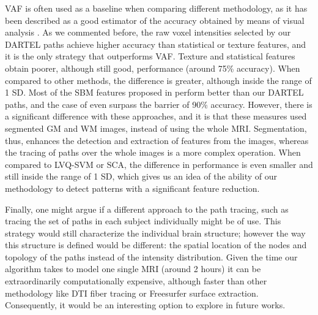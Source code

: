 	
	\ac{VAF} is often used as a baseline when comparing different methodology, as it has been described as a good estimator of the accuracy obtained by means of visual analysis \cite{Stoeckel04}. As we commented before, the raw voxel intensities selected by our DARTEL paths achieve higher accuracy than statistical or texture features, and it is the only strategy that outperforms \ac{VAF}. Texture and statistical features obtain poorer, although still good, performance (around 75\% accuracy). When compared to other methods, the difference is greater, although inside the range of 1 SD. Most of the \ac{SBM} features proposed in \cite{Martinez-Murcia2015} perform better than our DARTEL paths, and the case of \cite{Martinez-MurciaVRLBP} even surpass the barrier of 90\% accuracy. However, there is a significant difference with these approaches, and it is that these measures used segmented \ac{GM} and \ac{WM} images, instead of using the whole MRI. Segmentation, thus, enhances the detection and extraction of features from the images, whereas the tracing of paths over the whole images is a more complex operation. When compared to LVQ-SVM or SCA, the difference in performance is even smaller and still inside the range of 1 SD, which gives us an idea of the ability of our methodology to detect patterns with a significant feature reduction.
	
	Finally, one might argue if a different approach to the path tracing, such as tracing the set of paths in each subject individually might be of use. This strategy would still characterize the individual brain structure; however the way this structure is defined would be different: the spatial location of the nodes and topology of the paths instead of the intensity distribution. Given the time our algorithm takes to model one single MRI (around 2 hours) it can be extraordinarily computationally expensive, although faster than other methodology like DTI fiber tracing or Freesurfer surface extraction. Consequently, it would be an interesting option to explore in future works. 